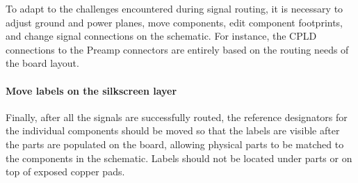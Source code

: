 To adapt to the challenges encountered during signal routing, it is necessary to adjust ground and power planes, move components, edit component footprints, and change signal connections on the schematic.  For instance, the CPLD connections to the Preamp connectors are entirely based on the routing needs of the board layout.

\paragraph{Move labels on the silkscreen layer}

Finally, after all the signals are successfully routed, the reference designators for the individual components should be moved so that the labels are visible after the parts are populated on the board, allowing physical parts to be matched to the components in the schematic.  Labels should not be located under parts or on top of exposed copper pads.



